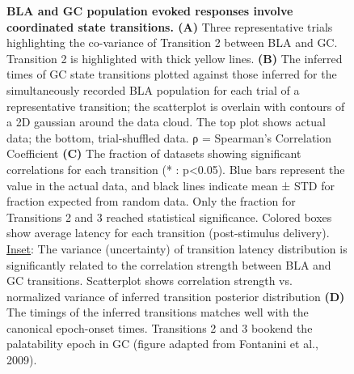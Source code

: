 \begin{refsection}
\begin{figure}
\caption{\textbf{BLA and GC population evoked responses involve coordinated state transitions. (A)} Three representative trials highlighting the co-variance of Transition 2 between BLA and GC. Transition 2 is highlighted with thick yellow lines. \textbf{(B)} The inferred times of GC state transitions plotted against those inferred for the simultaneously recorded BLA population for each trial of a representative transition; the scatterplot is overlain with contours of a 2D gaussian around the data cloud. The top plot shows actual data; the bottom, trial-shuffled data. ρ = Spearman’s Correlation Coefficient \textbf{(C)} The fraction of datasets showing significant correlations for each transition (* : p<0.05). Blue bars represent the value in the actual data, and black lines indicate mean ± STD for fraction expected from random data. Only the fraction for Transitions 2 and 3 reached statistical significance. Colored boxes show average latency for each transition (post-stimulus delivery). \underline{Inset}: The variance (uncertainty) of transition latency distribution is significantly related to the correlation strength between BLA and GC transitions. Scatterplot shows correlation strength vs. normalized variance of inferred transition posterior distribution \textbf{(D)} The timings of the inferred transitions matches well with the canonical epoch-onset times. Transitions 2 and 3 bookend the palatability epoch in GC (figure adapted from Fontanini et al., 2009).}
\label{fig:wrapfig}
\end{figure}


\end{refsection}
